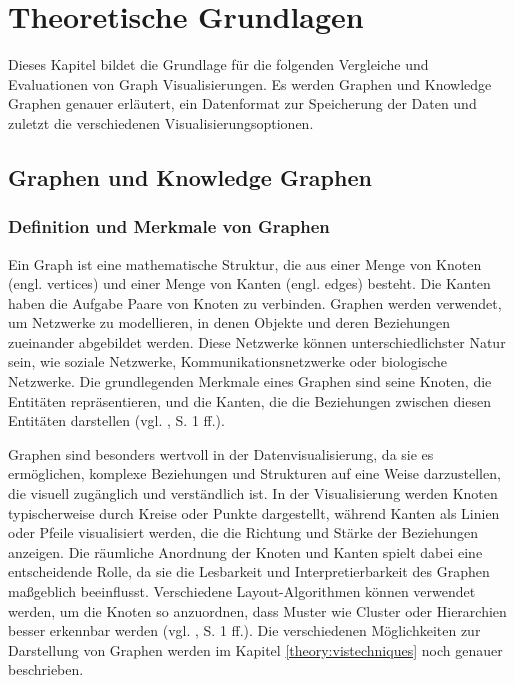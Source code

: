
\chapter{Theoretische Grundlagen}

Dieses Kapitel bildet die Grundlage für die folgenden Vergleiche und Evaluationen von Graph Visualisierungen. Es werden Graphen und Knowledge Graphen genauer erläutert, ein Datenformat zur Speicherung der Daten und zuletzt die verschiedenen Visualisierungsoptionen. 

\section{Graphen und Knowledge Graphen}

\subsection{Definition und Merkmale von Graphen}

Ein Graph ist eine mathematische Struktur, die aus einer Menge von Knoten (engl. vertices) und einer Menge von Kanten (engl. edges) besteht. Die Kanten haben die Aufgabe Paare von Knoten zu verbinden. Graphen werden verwendet, um Netzwerke zu modellieren, in denen Objekte und deren Beziehungen zueinander abgebildet werden. Diese Netzwerke können unterschiedlichster Natur sein, wie soziale Netzwerke, Kommunikationsnetzwerke oder biologische Netzwerke. Die grundlegenden Merkmale eines Graphen sind seine Knoten, die Entitäten repräsentieren, und die Kanten, die die Beziehungen zwischen diesen Entitäten darstellen (vgl. \cite{graphIntroduction:Wilson}, S. 1 ff.).

Graphen sind besonders wertvoll in der Datenvisualisierung, da sie es ermöglichen, komplexe Beziehungen und Strukturen auf eine Weise darzustellen, die visuell zugänglich und verständlich ist. In der Visualisierung werden Knoten typischerweise durch Kreise oder Punkte dargestellt, während Kanten als Linien oder Pfeile visualisiert werden, die die Richtung und Stärke der Beziehungen anzeigen. Die räumliche Anordnung der Knoten und Kanten spielt dabei eine entscheidende Rolle, da sie die Lesbarkeit und Interpretierbarkeit des Graphen maßgeblich beeinflusst. Verschiedene Layout-Algorithmen können verwendet werden, um die Knoten so anzuordnen, dass Muster wie Cluster oder Hierarchien besser erkennbar werden (vgl. \cite{graphIntroduction:Wilson}, S. 1 ff.). Die verschiedenen Möglichkeiten zur Darstellung von Graphen werden im Kapitel \ref{theory:vistechniques} noch genauer beschrieben.


